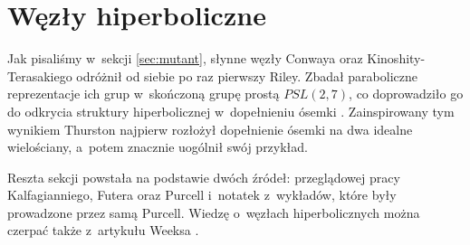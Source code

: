 
\section{Węzły hiperboliczne}
\label{sec:hyperbolic}
Jak pisaliśmy w~sekcji \ref{sec:mutant}, słynne węzły Conwaya oraz Kinoshity-Terasakiego odróżnił od siebie po raz pierwszy Riley.
%
%
Zbadał paraboliczne reprezentacje ich grup w~skończoną grupę prostą $PSL(2, 7)$, co doprowadziło go do odkrycia struktury hiperbolicznej w~dopełnieniu ósemki \cite{riley75}.
Zainspirowany tym wynikiem Thurston najpierw rozłożył dopełnienie ósemki na dwa idealne wielościany, a~potem znacznie uogólnił swój przykład.

Reszta sekcji powstała na podstawie dwóch źródeł: przeglądowej pracy Kalfagianniego, Futera oraz Purcell \cite{purcell19} i~notatek z~wykładów, które były prowadzone przez samą Purcell.
%
%
%
Wiedzę o~węzłach hiperbolicznych można czerpać także z~artykułu Weeksa \cite{weeks05}.
%









